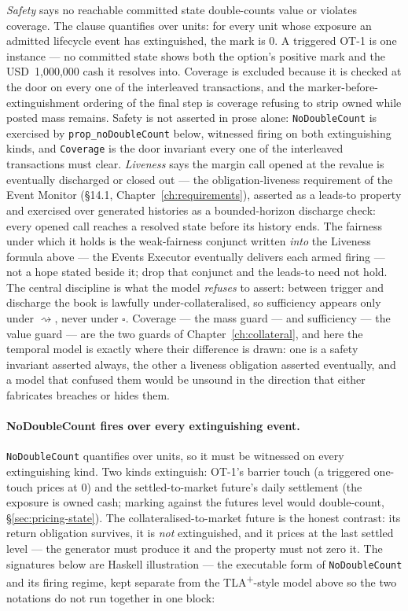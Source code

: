 \documentclass[11pt,a4paper]{article}
\newcommand{\USD}[1]{\mbox{USD~#1}}
\begin{document}
\emph{Safety} says no reachable committed state double-counts value or violates coverage.
The clause quantifies over units: for every unit whose exposure an admitted lifecycle event
has extinguished, the mark is $0$. A triggered OT-1 is one instance --- no committed state
shows both the option's positive mark and the \USD{1{,}000{,}000} cash it resolves into. Coverage
is excluded because it is checked at the door on every one of the interleaved transactions,
and the marker-before-extinguishment ordering of the final step is coverage refusing to
strip owned while posted mass remains. Safety is not asserted in prose alone: \texttt{NoDoubleCount} is exercised by
\texttt{prop\_noDoubleCount} below, witnessed firing on both extinguishing kinds, and
\texttt{Coverage} is the door invariant every one of the interleaved transactions must clear.
\emph{Liveness} says the margin call opened at the revalue is eventually discharged or closed
out --- the obligation-liveness requirement of the Event Monitor (\S 14.1,
Chapter~\ref{ch:requirements}), asserted as a leads-to property and exercised over generated
histories as a bounded-horizon discharge check: every opened call reaches a resolved state
before its history ends. The fairness under which it holds is the weak-fairness conjunct
written \emph{into} the Liveness formula above --- the Events Executor eventually delivers each
armed firing --- not a hope stated beside it; drop that conjunct and the leads-to need not
hold. The central discipline is what the model \emph{refuses} to assert: between trigger and
discharge the book is lawfully under-collateralised, so sufficiency appears only under
$\rightsquigarrow$, never under $\square$. Coverage --- the mass guard --- and sufficiency ---
the value guard --- are the two guards of Chapter~\ref{ch:collateral}, and here the temporal
model is exactly where their difference is drawn: one is a safety invariant asserted always,
the other a liveness obligation asserted eventually, and a model that confused them would be
unsound in the direction that either fabricates breaches or hides them.

\paragraph{NoDoubleCount fires over every extinguishing event.}
\texttt{NoDoubleCount} quantifies over units, so it must be witnessed on every extinguishing
kind. Two kinds extinguish: OT-1's barrier touch (a triggered one-touch prices at $0$) and
the settled-to-market future's daily settlement (the exposure is owned cash; marking against
the futures level would double-count, \S\ref{sec:pricing-state}). The
collateralised-to-market future is the honest contrast: its return obligation survives, it
is \emph{not} extinguished, and it prices at the last settled level --- the generator must
produce it and the property must not zero it. The
signatures below are Haskell illustration --- the executable form of \texttt{NoDoubleCount} and
its firing regime, kept separate from the TLA\textsuperscript{+}-style model above so the two
notations do not run together in one block:
\end{document}
